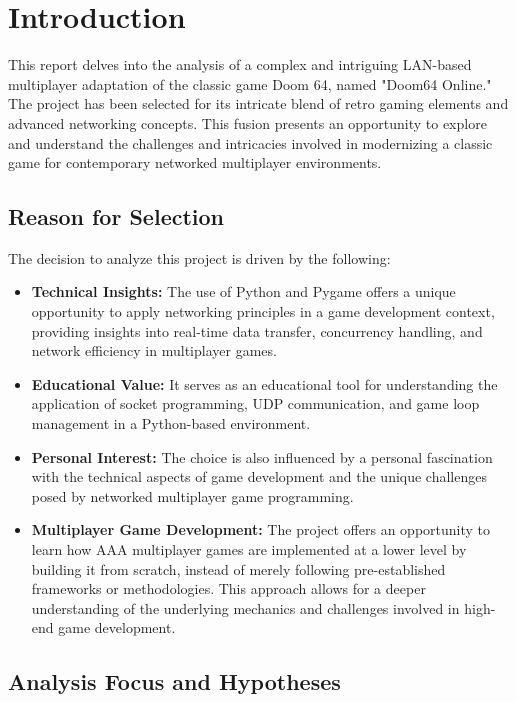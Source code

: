 
\section{Introduction}
\label{chap:introduction}

This report delves into the analysis of a complex and intriguing LAN-based multiplayer adaptation of the classic game Doom 64, named "Doom64 Online." The project has been selected for its intricate blend of retro gaming elements and advanced networking concepts. This fusion presents an opportunity to explore and understand the challenges and intricacies involved in modernizing a classic game for contemporary networked multiplayer environments.

\subsection{Reason for Selection}

The decision to analyze this project is driven by the following:
\begin{itemize}
    \item \textbf{Technical Insights:} The use of Python and Pygame \cite{pygame} offers a unique opportunity to apply networking principles in a game development context, providing insights into real-time data transfer, concurrency handling, and network efficiency in multiplayer games.
    \item \textbf{Educational Value:} It serves as an educational tool for understanding the application of socket programming, UDP communication, and game loop management in a Python-based environment.
    \item \textbf{Personal Interest:} The choice is also influenced by a personal fascination with the technical aspects of game development and the unique challenges posed by networked multiplayer game programming.
    \item \textbf{Multiplayer Game Development:} The project offers an opportunity to learn how AAA multiplayer games are implemented at a lower level by building it from scratch, instead of merely following pre-established frameworks or methodologies. This approach allows for a deeper understanding of the underlying mechanics and challenges involved in high-end game development.
\end{itemize}

\subsection{Analysis Focus and Hypotheses}

